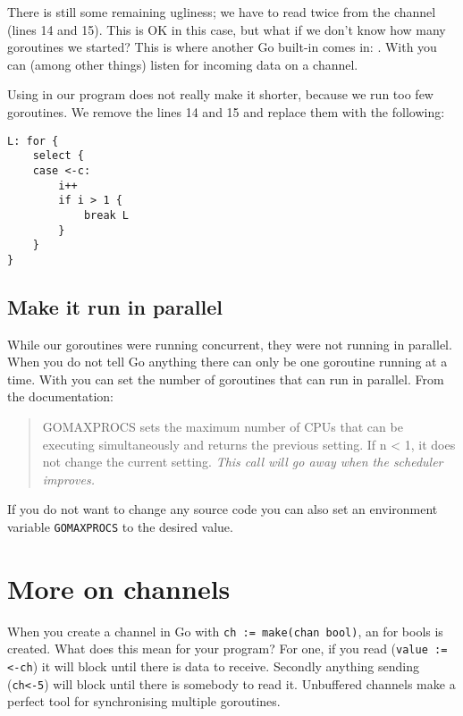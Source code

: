\showremarks
There is still some remaining ugliness; we have to read twice from
the channel (lines 14 and 15). This is OK in this case, but what if
we don't know how many goroutines we started? This is where another
Go built-in comes in: . With  you 
can (among other things) listen for incoming data on a channel.

Using  in our program does not really make it shorter,
because we run too few goroutines. We remove the lines 14 and 15 and
replace them with the following:
\begin{lstlisting}[caption=Using select,numbers=right,firstnumber=14]
L: for {
	select {
	case <-c:
		i++ 
		if i > 1 { 
			break L
		}   
	}   
}   
\end{lstlisting}

\subsection{Make it run in parallel}
While our goroutines were running concurrent, they were not running in
parallel. When you do not tell Go anything there can only be one
goroutine running at a time. With  you
can set the number of goroutines that can run in parallel. From
the documentation:
\begin{quote}
GOMAXPROCS sets the maximum number of CPUs that can be executing
simultaneously and returns the previous setting. If n < 1, it does not
change the current setting. \emph{This call will go away when the scheduler
improves.}
\end{quote}
If you do not want to change any source code you can also set an
environment variable \verb|GOMAXPROCS| to the desired value.

\section{More on channels}
\label{sec:more on channels}
When you create a channel in Go with \lstinline{ch := make(chan bool)}, 
an  for
bools is created. What does this mean for your program? For one, if you
read (\lstinline{value := <-ch}) it will block until there is data to
receive. Secondly anything sending (\lstinline{ch<-5}) will block until there
is somebody to read it. 
Unbuffered channels make a perfect tool for synchronising multiple
goroutines.

